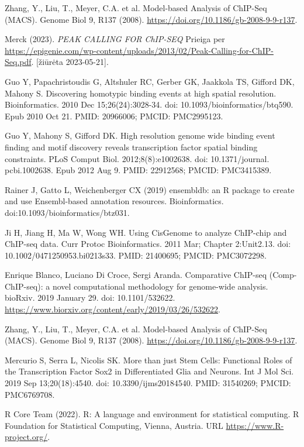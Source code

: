 \documentclass[12pt]{article}
\begin{document}
\begin{thebibliography}{99}
 Zhang, Y., Liu, T., Meyer, C.A. et al. Model-based Analysis
of ChIP-Seq (MACS). Genome Biol 9, R137 (2008).
\url{https://doi.org/10.1186/gb-2008-9-9-r137}.

Merck (2023). \emph{PEAK CALLING FOR ChIP-SEQ}
Prieiga per \url{https://epigenie.com/wp-content/uploads/2013/02/Peak-Calling-for-ChIP-Seq.pdf}.
[žiūrėta 2023-05-21].

 Guo Y, Papachristoudis G, Altshuler RC, Gerber GK, Jaakkola
TS, Gifford DK, Mahony S. Discovering homotypic binding events at high spatial
resolution. Bioinformatics. 2010 Dec 15;26(24):3028-34.
doi: 10.1093/bioinformatics/btq590. Epub 2010 Oct 21. PMID: 20966006;
PMCID: PMC2995123.

 Guo Y, Mahony S, Gifford DK. High resolution genome wide
binding event finding and motif discovery reveals transcription factor spatial
binding constraints. PLoS Comput Biol. 2012;8(8):e1002638. doi: 10.1371/journal.
pcbi.1002638. Epub 2012 Aug 9. PMID: 22912568; PMCID: PMC3415389.

 Rainer J, Gatto L, Weichenberger CX (2019) ensembldb: an R
package to create and use Ensembl-based annotation resources. Bioinformatics.
doi:10.1093/bioinformatics/btz031.

 Ji H, Jiang H, Ma W, Wong WH. Using CisGenome to analyze
ChIP-chip and ChIP-seq data. Curr Protoc Bioinformatics. 2011 Mar;
Chapter 2:Unit2.13. doi: 10.1002/0471250953.bi0213s33. PMID: 21400695;
PMCID: PMC3072298.

 Enrique Blanco, Luciano Di Croce, Sergi Aranda. Comparative
ChIP-seq (Comp-ChIP-seq): a novel computational methodology for genome-wide
analysis. bioRxiv. 2019 January 29. doi: 10.1101/532622. \newline
\url{https://www.biorxiv.org/content/early/2019/03/26/532622}.

 Zhang, Y., Liu, T., Meyer, C.A. et al.
Model-based Analysis of ChIP-Seq (MACS). Genome Biol 9, R137 (2008).
\url{https://doi.org/10.1186/gb-2008-9-9-r137}.

 Mercurio S, Serra L, Nicolis SK. More than just Stem Cells:
Functional Roles of the Transcription Factor Sox2 in Differentiated Glia and
Neurons. Int J Mol Sci. 2019 Sep 13;20(18):4540. doi: 10.3390/ijms20184540.
PMID: 31540269; PMCID: PMC6769708.

 R Core Team (2022). R: A language and environment for statistical
computing. R Foundation for Statistical Computing, Vienna, Austria. URL
\url{https://www.R-project.org/}.


\end{thebibliography}
\end{document}
